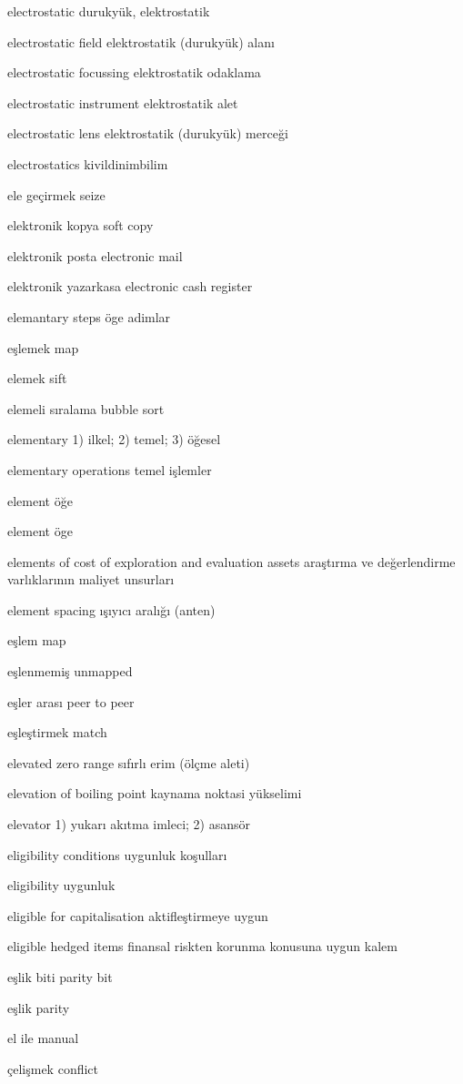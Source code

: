 \documentclass[12pt,fleqn]{article}\usepackage{../../common}
\begin{document}
electrostatic durukyük, elektrostatik

electrostatic field elektrostatik (durukyük) alanı

electrostatic focussing elektrostatik odaklama

electrostatic instrument elektrostatik alet

electrostatic lens elektrostatik (durukyük) merceği

electrostatics kivildinimbilim

ele geçirmek seize

elektronik kopya soft copy

elektronik posta electronic mail

elektronik yazarkasa electronic cash register

elemantary steps öge adimlar

eşlemek map

elemek sift

elemeli sıralama bubble sort

elementary 1) ilkel; 2) temel; 3) öğesel

elementary operations temel işlemler

element öğe

element öge

elements of cost of exploration and evaluation assets araştırma ve değerlendirme varlıklarının maliyet unsurları

element spacing ışıyıcı aralığı (anten)

eşlem map

eşlenmemiş unmapped

eşler arası peer to peer

eşleştirmek match

elevated zero range sıfırlı erim (ölçme aleti)

elevation of boiling point kaynama noktasi yükselimi

elevator 1) yukarı akıtma imleci; 2) asansör

eligibility conditions uygunluk koşulları

eligibility uygunluk

eligible for capitalisation aktifleştirmeye uygun

eligible hedged items finansal riskten korunma konusuna uygun kalem

eşlik biti parity bit

eşlik parity

el ile manual

çelişmek conflict
\end{document}

